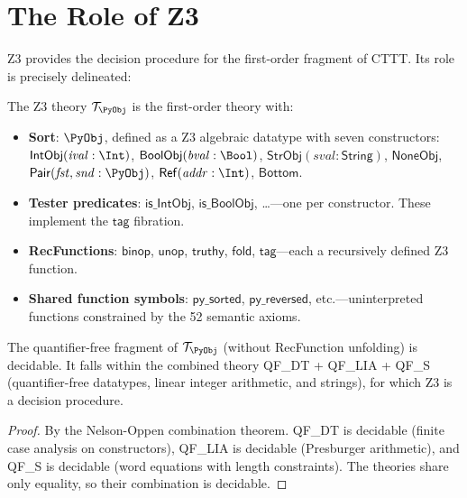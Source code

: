 \section{The Role of Z3}

Z3 provides the decision procedure for the first-order fragment of
CTTT.  Its role is precisely delineated:

\begin{definition}
\label{def:pyobj-theory}
The Z3 theory $\mathcal{T}_{\PyObj}$ is the first-order theory with:
\begin{itemize}
  \item \textbf{Sort}: $\PyObj$, defined as a Z3 algebraic datatype
    with seven constructors: $\mathsf{IntObj}(\mathit{ival} : \Int)$,
    $\mathsf{BoolObj}(\mathit{bval} : \Bool)$,
    $\mathsf{StrObj}(\mathit{sval} : \mathsf{String})$,
    $\mathsf{NoneObj}$, $\mathsf{Pair}(\mathit{fst}, \mathit{snd} : \PyObj)$,
    $\mathsf{Ref}(\mathit{addr} : \Int)$, $\mathsf{Bottom}$.
  \item \textbf{Tester predicates}: $\mathsf{is\_IntObj}$,
    $\mathsf{is\_BoolObj}$, \ldots---one per constructor.  These
    implement the $\mathsf{tag}$ fibration.
  \item \textbf{RecFunctions}: $\mathsf{binop}$, $\mathsf{unop}$,
    $\mathsf{truthy}$, $\mathsf{fold}$, $\mathsf{tag}$---each a
    recursively defined Z3 function.
  \item \textbf{Shared function symbols}: $\mathsf{py\_sorted}$,
    $\mathsf{py\_reversed}$, etc.---uninterpreted functions constrained
    by the 52 semantic axioms.
\end{itemize}
\end{definition}

\begin{proposition}
\label{prop:qf-decidable}
The quantifier-free fragment of $\mathcal{T}_{\PyObj}$ (without
RecFunction unfolding) is decidable.  It falls within the combined
theory QF\_DT + QF\_LIA + QF\_S (quantifier-free datatypes, linear
integer arithmetic, and strings), for which Z3 is a decision procedure.
\end{proposition}

\begin{proof}
By the Nelson-Oppen combination theorem.  QF\_DT is decidable
(finite case analysis on constructors), QF\_LIA is decidable
(Presburger arithmetic), and QF\_S is decidable (word equations
with length constraints).  The theories share only equality, so
their combination is decidable.
\end{proof}

